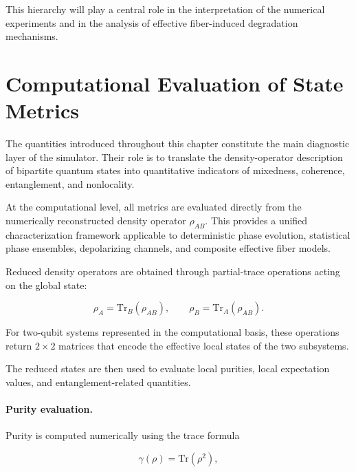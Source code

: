 This hierarchy will play a central role in the interpretation of the numerical experiments and in the analysis of effective fiber-induced degradation mechanisms.


\section{Computational Evaluation of State Metrics}

The quantities introduced throughout this chapter constitute the main diagnostic layer of the simulator. Their role is to translate the density-operator description of bipartite quantum states into quantitative indicators of mixedness, coherence, entanglement, and nonlocality.

\medskip

At the computational level, all metrics are evaluated directly from the numerically reconstructed density operator \( \rho_{AB} \). This provides a unified characterization framework applicable to deterministic phase evolution, statistical phase ensembles, depolarizing channels, and composite effective fiber models.

\medskip

Reduced density operators are obtained through partial-trace operations acting on the global state:

\[
\rho_A
=
\mathrm{Tr}_B(\rho_{AB}),
\qquad
\rho_B
=
\mathrm{Tr}_A(\rho_{AB}).
\]

For two-qubit systems represented in the computational basis, these operations return \(2\times2\) matrices that encode the effective local states of the two subsystems.

\medskip

The reduced states are then used to evaluate local purities, local expectation values, and entanglement-related quantities.

\medskip

\paragraph{Purity evaluation.}

Purity is computed numerically using the trace formula

\[
\gamma(\rho)
=
\mathrm{Tr}(\rho^2),
\]

